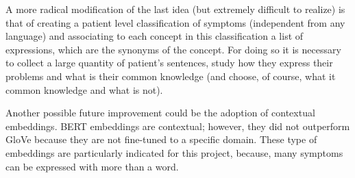 A more radical modification of the last idea (but extremely difficult to realize) is that of creating a patient level classification of symptoms (independent from any language) and associating to each concept in this classification a list of expressions, which are the synonyms of the concept. For doing so it is necessary to collect a large quantity of patient's sentences, study how they express their problems and what is their common knowledge (and choose, of course, what it common knowledge and what is not).

Another possible future improvement could be the adoption of contextual embeddings. BERT embeddings are contextual; however, they did not outperform GloVe because they are not fine-tuned to a specific domain. These type of embeddings are particularly indicated for this project, because, many symptoms can be expressed with more than a word.



